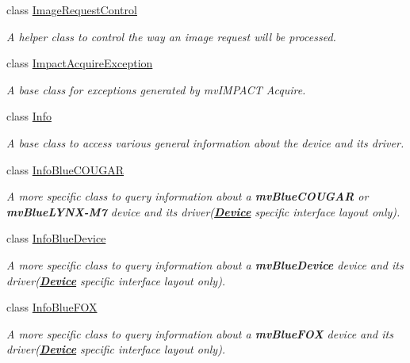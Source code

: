 \begin{DoxyCompactItemize}
class \hyperlink{classmv_i_m_p_a_c_t_1_1acquire_1_1_image_request_control}{Image\+Request\+Control}
\begin{DoxyCompactList}\small\item\em A helper class to control the way an image request will be processed. \end{DoxyCompactList}\item 
class \hyperlink{classmv_i_m_p_a_c_t_1_1acquire_1_1_impact_acquire_exception}{Impact\+Acquire\+Exception}
\begin{DoxyCompactList}\small\item\em A base class for exceptions generated by mv\+I\+M\+P\+A\+C\+T Acquire. \end{DoxyCompactList}\item 
class \hyperlink{classmv_i_m_p_a_c_t_1_1acquire_1_1_info}{Info}
\begin{DoxyCompactList}\small\item\em A base class to access various general information about the device and its driver. \end{DoxyCompactList}\item 
class \hyperlink{classmv_i_m_p_a_c_t_1_1acquire_1_1_info_blue_c_o_u_g_a_r}{Info\+Blue\+C\+O\+U\+G\+A\+R}
\begin{DoxyCompactList}\small\item\em A more specific class to query information about a {\bfseries mv\+Blue\+C\+O\+U\+G\+A\+R} or {\bfseries mv\+Blue\+L\+Y\+N\+X-\/\+M7} device and its driver({\bfseries \hyperlink{classmv_i_m_p_a_c_t_1_1acquire_1_1_device}{Device}} specific interface layout only). \end{DoxyCompactList}\item 
class \hyperlink{classmv_i_m_p_a_c_t_1_1acquire_1_1_info_blue_device}{Info\+Blue\+Device}
\begin{DoxyCompactList}\small\item\em A more specific class to query information about a {\bfseries mv\+Blue\+Device} device and its driver({\bfseries \hyperlink{classmv_i_m_p_a_c_t_1_1acquire_1_1_device}{Device}} specific interface layout only). \end{DoxyCompactList}\item 
class \hyperlink{classmv_i_m_p_a_c_t_1_1acquire_1_1_info_blue_f_o_x}{Info\+Blue\+F\+O\+X}
\begin{DoxyCompactList}\small\item\em A more specific class to query information about a {\bfseries mv\+Blue\+F\+O\+X} device and its driver({\bfseries \hyperlink{classmv_i_m_p_a_c_t_1_1acquire_1_1_device}{Device}} specific interface layout only). \end{DoxyCompactList}\item 

\end{DoxyCompactItemize}
